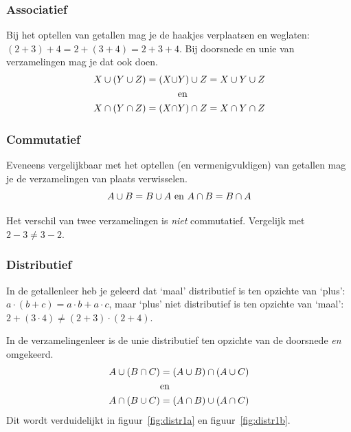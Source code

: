 \subsubsection{Associatief}
Bij het optellen van getallen mag je de haakjes verplaatsen en weglaten:
$(2+3)+4=2+(3+4)=2+3+4$. Bij doorsnede en unie van verzamelingen mag je dat ook doen.
\begin{equation*}
\begin{split}
X\cup (Y\cup Z)=(X\cup &Y)\cup Z =X\cup Y\cup Z 
\\ &\mathrm{en}\\
X\cap (Y\cap Z)=(X\cap &Y)\cap Z = X\cap Y\cap Z
\end{split}
\end{equation*}
\subsubsection{Commutatief}
Eveneens vergelijkbaar met het optellen (en vermenigvuldigen) van getallen mag je de verzamelingen van plaats verwisselen.
\begin{equation*}
A\cup B=B\cup A ~\mathrm{en}~A\cap B=B\cap A
\end{equation*}

Het verschil van twee verzamelingen is \emph{niet} commutatief. Vergelijk met $2-3\not = 3-2$.

\subsubsection{Distributief}
In de getallenleer heb je geleerd dat `maal' distributief is ten opzichte van `plus': $a\cdot (b+c)=a\cdot b+a\cdot c$, maar `plus' niet distributief is ten opzichte van `maal': $2+(3\cdot 4)\not = (2+3)\cdot (2+4)$. 

In de verzamelingenleer is de unie distributief ten opzichte van de doorsnede \emph{en} omgekeerd. 
\begin{equation*}
\begin{split}
A\cup(B\cap C)&=(A\cup B) \cap (A\cup C) \\ &\mathrm{en} \\ A\cap (B\cup C)&=(A\cap B)\cup (A\cap C)
\end{split}
\end{equation*}
Dit wordt verduidelijkt in figuur~\ref{fig:distr1a} en figuur~\ref{fig:distr1b}. 

